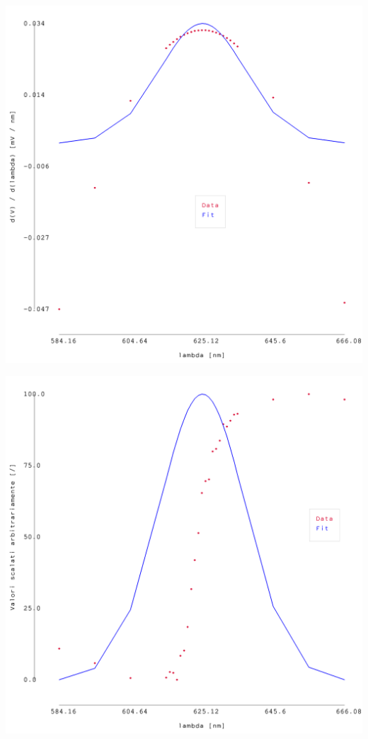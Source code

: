 \documentclass{article}
\begin{document}
\begin{center}
    \begin{minipage}{0.25\textwidth}        
        \includegraphics[width=1\linewidth]{../images/grafico1_2.png}
    \end{minipage}
    \hfill
    \begin{minipage}{0.25\textwidth}        
        \includegraphics[width=1\linewidth]{../images/grafico3_2.png}

\end{minipage}
\end{center}
\end{document}
